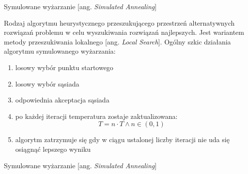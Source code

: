 \begin{frame}{Symulowane wyżarzanie [ang. \textit{Simulated Annealing}]}

	\begin{block}{}
	Rodzaj algorytmu heurystycznego przeszukującego przestrzeń alternatywnych rozwiązań problemu w celu wyszukiwania rozwiązań najlepszych. Jest wariantem metody przeszukiwania lokalnego [ang. \textit{Local Search}].
	Ogólny szkic działania algorytmu symulowanego wyżarzania:
	\end{block}
	\begin{enumerate}
		\item losowy wybór punktu startowego
		\item losowy wybór sąsiada
		\item odpowiednia akceptacja sąsiada
		\item po każdej iteracji temperatura zostaje zaktualizowana:
			$$ T = n\cdot T \wedge n \in (0,1)$$
		\item algorytm zatrzymuje się gdy w ciągu ustalonej liczby iteracji nie uda się osiągnąć lepszego wyniku
	\end{enumerate}

\end{frame}

\begin{frame}{Symulowane wyżarzanie [ang. \textit{Simulated Annealing}]}


\end{frame}

